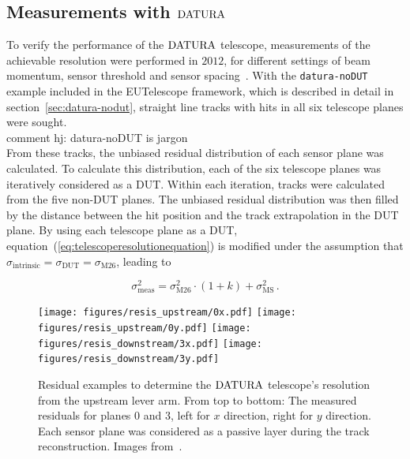 \subsection{Measurements with $\Datura$}

To verify the performance of the $\Datura$ telescope, measurements of the achievable resolution were performed in $2012$, for different settings of beam momentum,
 sensor threshold and sensor spacing~\cite{ref:thomas}.
With the \texttt{datura-noDUT} example included in the {EUTelescope} framework, which is described in detail in section~\ref{sec:datura-nodut},
 straight line tracks with hits in all six telescope planes were sought. 
 \\{comment hj: datura-noDUT is jargon}\\
From these tracks, the unbiased residual distribution of each sensor plane was calculated.
To calculate this distribution, each of the six telescope planes was iteratively considered as a DUT.
Within each iteration, tracks were calculated from the five non-DUT planes.
The unbiased residual distribution was then filled by the distance between the hit position and the track extrapolation in the DUT plane.
By using each telescope plane as a DUT, equation~(\ref{eq:telescoperesolutionequation}) is modified under the assumption that $\sigma_{\textrm{intrinsic}} = \sigma_{\textrm{DUT}} = \sigma_{\textrm{M26}}$,
 leading to

\begin{equation}
\label{eq:telescoperesolutionequation_2}
\sigma_{\textrm{meas}}^2 = \sigma_{\textrm{M26}}^2 \cdot \left( 1 + k \right) +
\sigma_{\textrm{MS}}^2\,.
\end{equation}

\begin{figure}[tb]
  \centering
  \texttt{[image: figures/resis\_upstream/0x.pdf]}
  \texttt{[image: figures/resis\_upstream/0y.pdf]}
  \texttt{[image: figures/resis\_downstream/3x.pdf]}
  \texttt{[image: figures/resis\_downstream/3y.pdf]}
  \caption[Residual examples to determine the $\Datura$ telescope's resolution~\cite{ref:thomas}]{Residual examples to determine the $\Datura$ telescope's resolution from the upstream lever arm.
From top to bottom: The measured residuals for planes $0$ and $3$, left for $x$ direction, right for $y$ direction.
Each sensor plane was considered as a passive layer during the track reconstruction. Images from~\cite{ref:thomas}.}
  \label{fig:residualexample1}
\end{figure}

